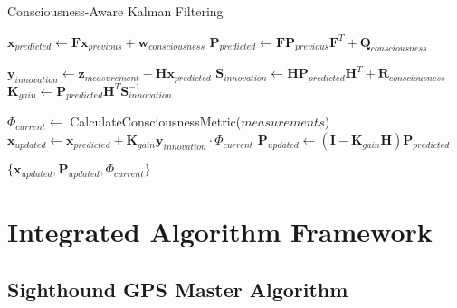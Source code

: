 \documentclass[12pt,a4paper]{article}
\begin{document}
\begin{algorithm}
\caption{Consciousness-Aware Kalman Filtering}
\begin{algorithmic}[1]
    \State $\mathbf{x}_{predicted} \gets \mathbf{F} \mathbf{x}_{previous} + \mathbf{w}_{consciousness}$
    \State $\mathbf{P}_{predicted} \gets \mathbf{F} \mathbf{P}_{previous} \mathbf{F}^T + \mathbf{Q}_{consciousness}$
    
    \State $\mathbf{y}_{innovation} \gets \mathbf{z}_{measurement} - \mathbf{H} \mathbf{x}_{predicted}$
    \State $\mathbf{S}_{innovation} \gets \mathbf{H} \mathbf{P}_{predicted} \mathbf{H}^T + \mathbf{R}_{consciousness}$
    \State $\mathbf{K}_{gain} \gets \mathbf{P}_{predicted} \mathbf{H}^T \mathbf{S}_{innovation}^{-1}$
    
    \State $\Phi_{current} \gets$ CalculateConsciousnessMetric($measurements$)
    \State $\mathbf{x}_{updated} \gets \mathbf{x}_{predicted} + \mathbf{K}_{gain} \mathbf{y}_{innovation} \cdot \Phi_{current}$
    \State $\mathbf{P}_{updated} \gets (\mathbf{I} - \mathbf{K}_{gain} \mathbf{H}) \mathbf{P}_{predicted}$
    
    \State \Return $\{\mathbf{x}_{updated}, \mathbf{P}_{updated}, \Phi_{current}\}$
\EndProcedure
\end{algorithmic}
\end{algorithm}

\section{Integrated Algorithm Framework}

\subsection{Sighthound GPS Master Algorithm}
\end{document}
